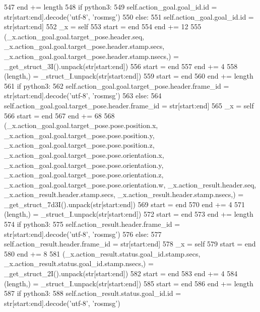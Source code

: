 \begin{DoxyCode}
547       end += length
548       \textcolor{keywordflow}{if} python3:
549         self.action\_goal.goal\_id.id = str[start:end].decode(\textcolor{stringliteral}{'utf-8'}, \textcolor{stringliteral}{'rosmsg'})
550       \textcolor{keywordflow}{else}:
551         self.action\_goal.goal\_id.id = str[start:end]
552       \_x = self
553       start = end
554       end += 12
555       (\_x.action\_goal.goal.target\_pose.header.seq, \_x.action\_goal.goal.target\_pose.header.stamp.secs, 
      \_x.action\_goal.goal.target\_pose.header.stamp.nsecs,) = \_get\_struct\_3I().unpack(str[start:end])
556       start = end
557       end += 4
558       (length,) = \_struct\_I.unpack(str[start:end])
559       start = end
560       end += length
561       \textcolor{keywordflow}{if} python3:
562         self.action\_goal.goal.target\_pose.header.frame\_id = str[start:end].decode(\textcolor{stringliteral}{'utf-8'}, \textcolor{stringliteral}{'rosmsg'})
563       \textcolor{keywordflow}{else}:
564         self.action\_goal.goal.target\_pose.header.frame\_id = str[start:end]
565       \_x = self
566       start = end
567       end += 68
568       (\_x.action\_goal.goal.target\_pose.pose.position.x, \_x.action\_goal.goal.target\_pose.pose.position.y, 
      \_x.action\_goal.goal.target\_pose.pose.position.z, \_x.action\_goal.goal.target\_pose.pose.orientation.x, 
      \_x.action\_goal.goal.target\_pose.pose.orientation.y, \_x.action\_goal.goal.target\_pose.pose.orientation.z, 
      \_x.action\_goal.goal.target\_pose.pose.orientation.w, \_x.action\_result.header.seq, \_x.action\_result.header.stamp.secs, 
      \_x.action\_result.header.stamp.nsecs,) = \_get\_struct\_7d3I().unpack(str[start:end])
569       start = end
570       end += 4
571       (length,) = \_struct\_I.unpack(str[start:end])
572       start = end
573       end += length
574       \textcolor{keywordflow}{if} python3:
575         self.action\_result.header.frame\_id = str[start:end].decode(\textcolor{stringliteral}{'utf-8'}, \textcolor{stringliteral}{'rosmsg'})
576       \textcolor{keywordflow}{else}:
577         self.action\_result.header.frame\_id = str[start:end]
578       \_x = self
579       start = end
580       end += 8
581       (\_x.action\_result.status.goal\_id.stamp.secs, \_x.action\_result.status.goal\_id.stamp.nsecs,) = 
      \_get\_struct\_2I().unpack(str[start:end])
582       start = end
583       end += 4
584       (length,) = \_struct\_I.unpack(str[start:end])
585       start = end
586       end += length
587       \textcolor{keywordflow}{if} python3:
588         self.action\_result.status.goal\_id.id = str[start:end].decode(\textcolor{stringliteral}{'utf-8'}, \textcolor{stringliteral}{'rosmsg'})

\end{DoxyCode}
